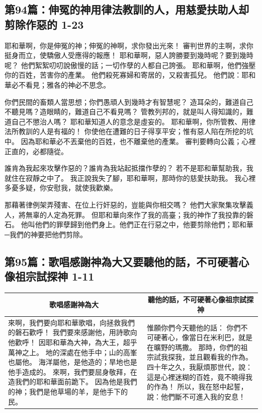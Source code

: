 \subsection{第94篇：伸冤的神用律法教訓的人，用慈愛扶助人却剪除作惡的 1-23}
耶和華啊，你是伸冤的神；伸冤的神啊，求你發出光來！
審判世界的主啊，求你挺身而立，使驕傲人受應得的報應！
耶和華啊，惡人誇勝要到幾時呢？要到幾時呢？
他們絮絮叨叨說傲慢的話；一切作孽的人都自己誇張。
耶和華啊，他們強壓你的百姓，苦害你的產業。
他們殺死寡婦和寄居的，又殺害孤兒。
他們說：耶和華必不看見；雅各的神必不思念。

你們民間的畜類人當思想；你們愚頑人到幾時才有智慧呢？
造耳朵的，難道自己不聽見嗎？造眼睛的，難道自己不看見嗎？
管教列邦的，就是叫人得知識的，難道自己不懲治人嗎？
耶和華知道人的意念是虛妄的。
耶和華啊，你所管教、用律法所教訓的人是有福的！
你使他在遭難的日子得享平安；惟有惡人陷在所挖的坑中。
因為耶和華必不丟棄他的百姓，也不離棄他的產業。
審判要轉向公義；心裡正直的，必都隨從。

誰肯為我起來攻擊作惡的？誰肯為我站起抵擋作孽的？
若不是耶和華幫助我，我就住在寂靜之中了。
我正說我失了腳，耶和華啊，那時你的慈愛扶助我。
我心裡多憂多疑，你安慰我，就使我歡樂。

那藉著律例架弄殘害、在位上行奸惡的，豈能與你相交嗎？
他們大家聚集攻擊義人，將無辜的人定為死罪。
但耶和華向來作了我的高臺；我的神作了我投靠的磐石。
他叫他們的罪孽歸到他們身上。他們正在行惡之中，他要剪除他們；耶和華─我們的神要把他們剪除。

\subsection{第95篇：歌唱感謝神為大又要聽他的話，不可硬著心像祖宗試探神 1-11}
\begin{table}[H]
\centering
\begin{tabular}{p{9.5cm}|p{7.25cm}}\hline\hline
\multicolumn{1}{c|}{歌唱感謝神為大}&\multicolumn{1}{c}{聽他的話，不可硬著心像祖宗試探神}\\\hline
來啊，我們要向耶和華歌唱，向拯救我們的磐石歡呼！
我們要來感謝他，用詩歌向他歡呼！
因耶和華為大神，為大王，超乎萬神之上。
地的深處在他手中；山的高峯也屬他。
海洋屬他，是他造的；旱地也是他手造成的。
來啊，我們要屈身敬拜，在造我們的耶和華面前跪下。
因為他是我們的神；我們是他草場的羊，是他手下的民。
&惟願你們今天聽他的話：
你們不可硬著心，像當日在米利巴，就是在曠野的瑪撒。
那時，你們的祖宗試我探我，並且觀看我的作為。
四十年之久，我厭煩那世代，說：這是心裡迷糊的百姓，竟不曉得我的作為！
所以，我在怒中起誓，說：他們斷不可進入我的安息！\\\hline
\end{tabular}
\end{table} 





